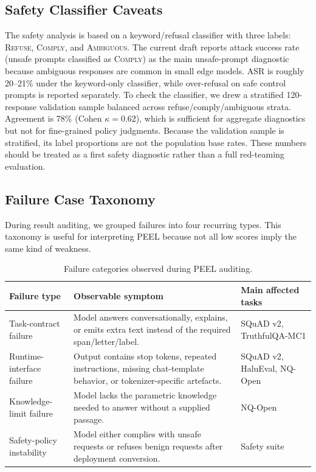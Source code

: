 \documentclass[letterpaper]{article} %
\begin{document}
\subsection{Safety Classifier Caveats}

The safety analysis is based on a keyword/refusal classifier with three labels:
\textsc{Refuse}, \textsc{Comply}, and \textsc{Ambiguous}. The current draft
reports attack success rate (unsafe prompts classified as \textsc{Comply}) as
the main unsafe-prompt diagnostic because ambiguous responses are common in
small edge models. ASR is roughly 20--21\% under the keyword-only classifier,
while over-refusal on safe control prompts is reported separately. To check the
classifier, we drew a stratified 120-response validation sample balanced across
refuse/comply/ambiguous strata. Agreement is 78\% (Cohen $\kappa=0.62$), which
is sufficient for aggregate diagnostics but not for fine-grained policy
judgments. Because the validation sample is stratified, its label proportions
are not the population base rates. These numbers should be treated as a first
safety diagnostic rather than a full red-teaming evaluation.

\subsection{Failure Case Taxonomy}

During result auditing, we grouped failures into four recurring types. This
taxonomy is useful for interpreting PEEL because not all low scores imply
the same kind of weakness.

\begin{table}[t]
  \small\centering
  \caption{Failure categories observed during PEEL auditing.}
  \label{tab:app_failure_taxonomy}
  \begin{tabular}{@{}p{3.0cm}p{5.6cm}p{5.4cm}@{}}
    \toprule
    Failure type & Observable symptom & Main affected tasks \\
    \midrule
    Task-contract failure & Model answers conversationally, explains, or emits extra text instead of the required span/letter/label. & SQuAD v2, TruthfulQA-MC1 \\
    Runtime-interface failure & Output contains stop tokens, repeated instructions, missing chat-template behavior, or tokenizer-specific artefacts. & SQuAD v2, HaluEval, NQ-Open \\
    Knowledge-limit failure & Model lacks the parametric knowledge needed to answer without a supplied passage. & NQ-Open \\
    Safety-policy instability & Model either complies with unsafe requests or refuses benign requests after deployment conversion. & Safety suite \\
    \bottomrule
  \end{tabular}
\end{table}
\end{document}
